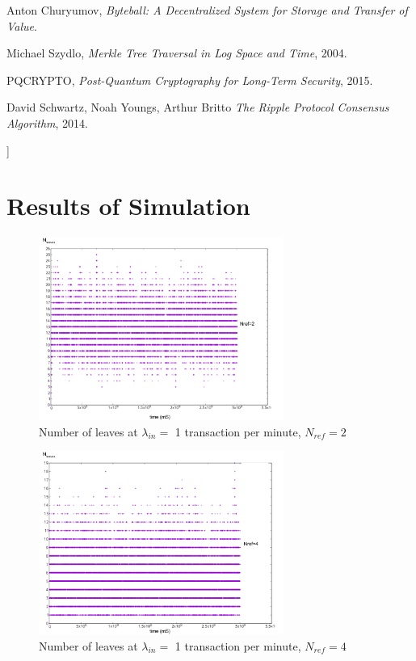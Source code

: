 \documentclass[a4paper,10pt,twocolumn]{article}
\begin{document}
\begin{@twocolumnfalse}
\begin{thebibliography}{99}
	Anton Churyumov,
		\emph{Byteball: A Decentralized System for Storage and 	Transfer of Value}.	

	Michael Szydlo,
		\emph{Merkle Tree Traversal in Log Space and Time}, 2004.	

		PQCRYPTO,
			\emph{Post-Quantum Cryptography for Long-Term Security}, 2015.	
	
	David Schwartz, Noah Youngs, Arthur Britto
			\emph{The Ripple Protocol Consensus Algorithm}, 2014.	
	

	\end{thebibliography}
	
	\end{@twocolumnfalse}
	]


\clearpage

\appendix
\section{Results of Simulation}
\label{ap1}

\begin{figure}[ht]
	\begin{center}
	\includegraphics[width=80mm]{1min_2.png}
	  \caption{Number of leaves at \( \lambda_{in}=\) 1 transaction per minute, \( N_{ref}=2\)}
	\label{fig:min1_2}
	\end{center}
 \end{figure}

 \begin{figure}[ht]
	\begin{center}
		\includegraphics[width=80mm]{1min_4.png}
		\caption{Number of leaves at \( \lambda_{in}=\) 1 transaction per minute, \( N_{ref}=4\)}
	  \label{fig:min1_4}
	\end{center}
 \end{figure}
\end{document}
